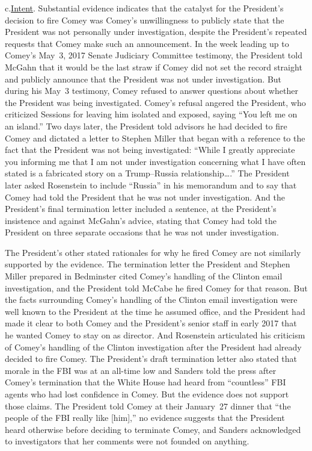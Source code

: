 c.\qquad\underline{Intent}.
Substantial evidence indicates that the catalyst for the President's decision to fire Comey was Comey's unwillingness to publicly state that the President was not personally under investigation, despite the President's repeated requests that Comey make such an announcement.
In the week leading up to Comey's May~3, 2017 Senate Judiciary Committee testimony, the President told McGahn that it would be the last straw if Comey did not set the record straight and publicly announce that the President was not under investigation.
But during his May~3 testimony, Comey refused to answer questions about whether the President was being investigated.
Comey's refusal angered the President, who criticized Sessions for leaving him isolated and exposed, saying ``You left me on an island.''
Two days later, the President told advisors he had decided to fire Comey and dictated a letter to Stephen Miller that began with a reference to the fact that the President was not being investigated:
``While I greatly appreciate you informing me that I am not under investigation concerning what I have often stated is a fabricated story on a Trump--Russia relationship\dots.''
The President later asked Rosenstein to include ``Russia'' in his memorandum and to say that Comey had told the President that he was not under investigation.
And the President's final termination letter included a sentence, at the President's insistence and against McGahn's advice, stating that Comey had told the President on three separate occasions that he was not under investigation.

The President's other stated rationales for why he fired Comey are not similarly supported by the evidence.
The termination letter the President and Stephen Miller prepared in Bedminster cited Comey's handling of the Clinton email investigation, and the President told McCabe he fired Comey for that reason.
But the facts surrounding Comey's handling of the Clinton email investigation were well known to the President at the time he assumed office, and the President had made it clear to both Comey and the President's senior staff in early 2017 that he wanted Comey to stay on as director.
And Rosenstein articulated his criticism of Comey's handling of the Clinton investigation after the President had already decided to fire Comey.
The President's draft termination letter also stated that morale in the FBI was at an all-time low and Sanders told the press after Comey's termination that the White House had heard from ``countless'' FBI agents who had lost confidence in Comey.
But the evidence does not support those claims.
The President told Comey at their January~27 dinner that ``the people of the FBI really like [him],'' no evidence suggests that the President heard otherwise before deciding to terminate Comey, and Sanders acknowledged to investigators that her comments were not founded on anything.

